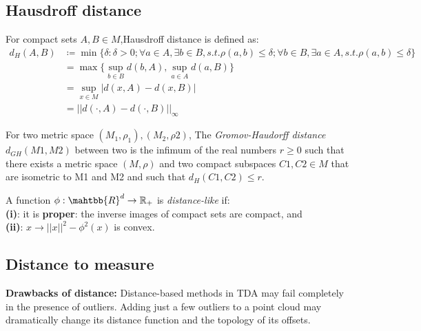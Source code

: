 \subsection{Hausdroff distance}
\begin{definition}
For compact sets $A,B \in M$,Hausdroff distance is defined as:
\begin{align*}
    d_H(A,B)& \coloneqq \min\{\delta : \delta >0; \forall a \in A, \exists b \in B, s.t. \rho(a, b) \leq \delta; \forall b \in B, \exists a \in A, s.t. \rho(a, b) \leq \delta\}\\
    &= \max \{\sup_{b \in B} d(b,A),\sup_{a \in A} d(a,B)\}\\
    &= \sup_{x \in M}|d(x,A)-d(x,B)|\\
    &=||d(\cdot,A)-d(\cdot,B)||_{\infty}
\end{align*}
\end{definition}
\begin{definition}
For two metric space $(M_1,\rho_1), (M_2,\rho 2)$, The \textit{Gromov-Haudorff distance} $d_{GH}(M1, M2)$ between two is the infimum of the real numbers $r \geq 0$ such that there exists a metric space $(M, \rho)$ and two
compact subspaces $C1, C2 \in M$ that are isometric to M1 and M2 and such that $d_H(C1, C2) \leq r$.

\end{definition}
\begin{definition}
A function $\phi:\mahtbb{R}^d \rightarrow \mathbb{R}_+$ is \textit{distance-like} if:\\
\textbf{(i)}: it is \textbf{proper}: the inverse images of compact sets are compact, and\\
\textbf{(ii)}: $x\rightarrow||x||^2-\phi^2(x)$ is convex.
\end{definition}

\subsection{Distance to measure}
\textbf{Drawbacks of distance:} Distance-based methods in TDA may fail completely in the presence of outliers. Adding just a few outliers to a point cloud may dramatically change its distance function and the topology of its
offsets.

